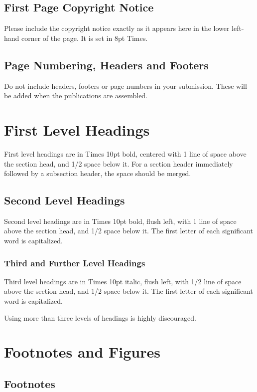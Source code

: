 \documentclass{article}
\begin{document}
\subsection{First Page Copyright Notice}

Please include the copyright notice exactly as it appears here in the lower left-hand corner of the page.
It is set in 8pt Times.

\subsection{Page Numbering, Headers and Footers}

Do not include headers, footers or page numbers in your submission.
These will be added when the publications are assembled.

\section{First Level Headings}

First level headings are in Times 10pt bold,
centered with 1 line of space above the section head, and 1/2 space below it.
For a section header immediately followed by a subsection header, the space should be merged.

\subsection{Second Level Headings}

Second level headings are in Times 10pt bold, flush left,
with 1 line of space above the section head, and 1/2 space below it.
The first letter of each significant word is capitalized.

\subsubsection{Third and Further Level Headings}

Third level headings are in Times 10pt italic, flush left,
with 1/2 line of space above the section head, and 1/2 space below it.
The first letter of each significant word is capitalized.

Using more than three levels of headings is highly discouraged.

\section{Footnotes and Figures}

\subsection{Footnotes}
\end{document}
